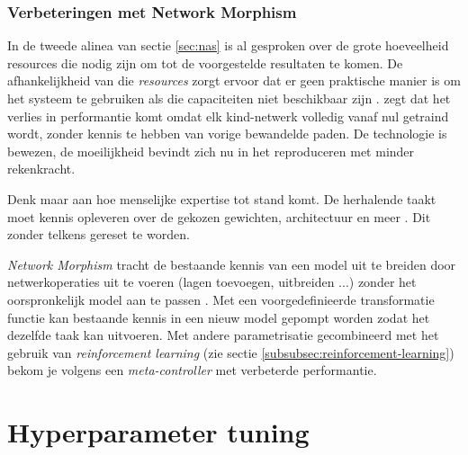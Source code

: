\subsubsection{Verbeteringen met Network Morphism}
\label{subsubsec:network-morphism}

In de tweede alinea van sectie \ref{sec:nas} is al gesproken over de grote hoeveelheid resources die nodig zijn om tot de voorgestelde resultaten te komen. De afhankelijkheid van die \textit{resources} zorgt ervoor dat er geen praktische manier is om het systeem te gebruiken als die capaciteiten niet beschikbaar zijn \autocite{Cai2017}. \textcite{Cai2017} zegt dat het verlies in performantie komt omdat elk kind-netwerk volledig vanaf nul getraind wordt, zonder kennis te hebben van vorige bewandelde paden. De technologie is bewezen, de moeilijkheid bevindt zich nu in het reproduceren met minder rekenkracht.

Denk maar aan hoe menselijke expertise tot stand komt. De herhalende taakt moet kennis opleveren over de gekozen gewichten, architectuur en meer \autocite{Chen2016}. Dit zonder telkens gereset te worden.

\textit{Network Morphism} tracht de bestaande kennis van een model uit te breiden door netwerkoperaties uit te voeren (lagen toevoegen, uitbreiden ...) zonder het oorspronkelijk model aan te passen \autocite{Cai2017}. Met een voorgedefinieerde transformatie functie kan bestaande kennis in een nieuw model gepompt worden zodat het dezelfde taak kan uitvoeren. Met andere parametrisatie gecombineerd met het gebruik van \textit{reinforcement learning} (zie sectie \ref{subsubsec:reinforcement-learning}) bekom je volgens \textcite{Cai2017} een \textit{meta-controller} met verbeterde performantie.

\section{Hyperparameter tuning}
\label{sec:hyperparameter-tuning}

